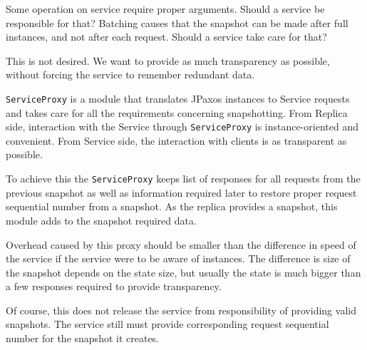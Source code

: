 Some operation on service require proper arguments. Should a service be responsible for that? Batching causes that the snapshot can be made after full instances, and not after each request. Should a service take care  for that?

This is not desired. We want to provide as much transparency as possible, without forcing the service to remember redundant data.

\texttt{ServiceProxy} is a module that translates JPaxos instances to Service requests and takes care for all the requirements concerning snapshotting. From Replica side, interaction with the Service through \texttt{ServiceProxy} is instance-oriented and convenient. From Service side, the interaction with clients is as transparent as possible.

To achieve this the \texttt{ServiceProxy} keeps list of responses for all requests from the previous snapshot as well as information required later to restore proper request sequential number from a snapshot.
As the replica provides a snapshot, this module adds to the snapshot required data.

Overhead caused by this proxy should be smaller than the difference in speed of the service if the service were to be aware of instances. The difference is size of the snapshot depends on the state size, but usually the state is much bigger than a few responses required to provide transparency.

Of course, this does not release the service from responsibility of providing valid snapshots. The service still must provide corresponding request sequential number for the snapshot it creates.
